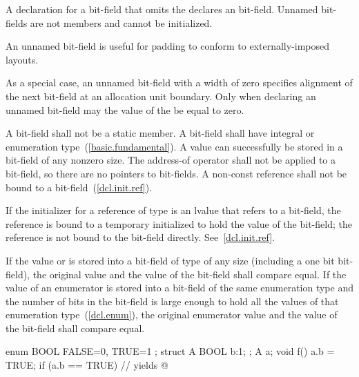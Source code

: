 \pnum
{}%
A declaration for a bit-field that omits the 
declares an  bit-field. Unnamed bit-fields are not
members and cannot be initialized.
\begin{note}
An unnamed bit-field is useful for padding to conform to
externally-imposed layouts.
\end{note}
%
%
As a special case, an unnamed bit-field with a width of zero specifies
alignment of the next bit-field at an allocation unit boundary. Only
when declaring an unnamed bit-field may the value of the
 be equal to zero.

\pnum
{}%
A bit-field shall not be a static member. A bit-field shall have
integral or enumeration type~(\ref{basic.fundamental}).
%
A  value can successfully be stored in a bit-field of any
nonzero size.
%
The address-of operator \tcode{\&} shall not be applied to a bit-field,
so there are no pointers to bit-fields.
%
%
%
A non-const reference shall not be bound to a
bit-field~(\ref{dcl.init.ref}).
\begin{note}
If the initializer for a reference of type   is
an lvalue that refers to a bit-field, the reference is bound to a
temporary initialized to hold the value of the bit-field; the reference
is not bound to the bit-field directly. See~\ref{dcl.init.ref}.
\end{note}

\pnum
If the value  or  is stored into a bit-field of
type  of any size (including a one bit bit-field), the
original  value and the value of the bit-field shall compare
equal. If the value of an enumerator is stored into a bit-field of the
same enumeration type and the number of bits in the bit-field is large
enough to hold all the values of that enumeration type~(\ref{dcl.enum}),
the original enumerator value and the value of the bit-field shall
compare equal.
\begin{example}

\begin{codeblock}
enum BOOL { FALSE=0, TRUE=1 };
struct A {
  BOOL b:1;
};
A a;
void f() {
  a.b = TRUE;
  if (a.b == TRUE)              // yields 
    { @\commentellip@ }
}
\end{codeblock}
\end{example}

